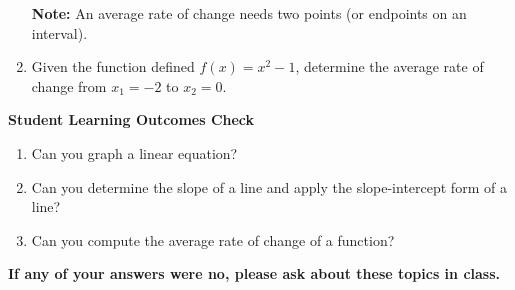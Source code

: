 \begin{enumerate}
\noindent \textbf{Note:  }An average rate of change needs two points (or endpoints on an interval). 






\item Given the function defined $f(x)=x^2-1$, determine the average rate of change from $x_1=-2$ to $x_2=0.$\\[2in]


\end{enumerate}

\noindent \textbf{Student Learning Outcomes Check}

\begin{enumerate}
\item Can you graph a linear equation?
\item Can you determine the slope of a line and apply the slope-intercept form of a line?
\item Can you compute the average rate of change of a function?
\end{enumerate}

\noindent \textbf{If any of your answers were no, please ask about these topics in class.}

